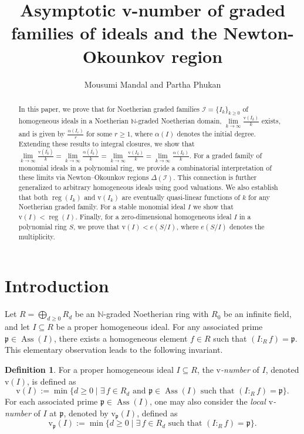 \documentclass[11pt,reqno,a4paper]{amsart}
\title[v-Number and the Newton-Okounkov region]{Asymptotic v-number of graded families of ideals  and the Newton-Okounkov region}
\author{Mousumi Mandal and Partha Phukan}
\theoremstyle{definition}
\newtheorem{definition}[theorem]{Definition}
\begin{document}
\maketitle

    
\begin{abstract}
In this paper, we prove that for Noetherian graded families $\mathcal{I} = \{I_k\}_{k \ge 0}$ of homogeneous ideals in a Noetherian $\mathbb{N}$-graded Noetherian domain, $\lim\limits_{k \to \infty} \frac{\mathrm{v}(I_k)}{k}$ exists, 
and is given by $\frac{\alpha(I_r)}{r}$ for some $r \ge 1$, where $\alpha(I)$ denotes the initial degree. Extending these results to integral closures, we show that
$
\lim\limits_{k\to\infty}\frac{\mathrm{v}(\overline{I_k})}{k} =  \lim\limits_{k\to\infty}\frac{\alpha(\overline{I_k})}{k}=\lim\limits_{k\to\infty}\frac{\mathrm{v}(I_k)}{k}=\lim\limits_{k\to\infty}\frac{\alpha(I_k)}{k}  
$. 
For a graded family of monomial ideals in a polynomial ring, we provide a combinatorial interpretation of these limits via Newton--Okounkov regions $\Delta(\mathcal{I})$.
This connection is further generalized to arbitrary homogeneous ideals using good valuations. We also establish that both $\operatorname{reg}(I_k)$ and $\mathrm{v}(I_k)$ are eventually quasi-linear functions of $k$ for any Noetherian graded family. 
For a stable monomial ideal $I$ we show that $\mathrm{v}(I) < \operatorname{reg}(I)$. Finally, for a zero-dimensional homogeneous ideal $I$ in a polynomial ring $S$, we prove that $\mathrm{v}(I) < e(S/I)$, where $e(S/I)$ denotes the  multiplicity.
\end{abstract}





\section{Introduction}


Let $R = \bigoplus_{d \geq 0} R_d$ be an $\mathbb{N}$-graded Noetherian ring with $R_0$ be an infinite field, and let $I \subseteq R$ be a proper homogeneous ideal. For any associated prime $\mathfrak{p} \in \operatorname{Ass}(I)$, there exists a homogeneous element $f \in R$ such that $(I:_R f) = \mathfrak{p}$. This elementary observation leads to the following invariant.

\begin{definition}
For a proper homogeneous ideal $I \subseteq R$, the {\it $\mathrm{v}$-number} of $I$, denoted $\mathrm{v}(I)$, is defined as
\[
\mathrm{v}(I) := \min\{ d \geq 0 \mid \exists \, f \in R_d \text{ and } \mathfrak{p} \in \operatorname{Ass}(I) \text{ such that } (I:_R f) = \mathfrak{p} \}.
\]
For each associated prime $\mathfrak{p} \in \operatorname{Ass}(I)$, one may also consider the {\it local $\mathrm{v}$-number} of $I$ at $\mathfrak{p}$, denoted by $\mathrm{v}_{\mathfrak{p}}(I)$, defined as
\[
\mathrm{v}_{\mathfrak{p}}(I) := \min\{ d \geq 0 \mid \exists \, f \in R_d \text{ such that } (I:_R f) = \mathfrak{p} \}.
\]
\end{definition}
\end{document}
